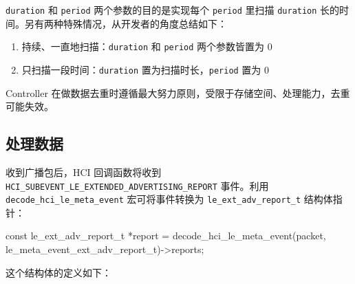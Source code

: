 \documentclass[
  12pt,
]{book}
\makeatletter
\newenvironment{Shaded}{\begin{snugshade}}{\end{snugshade}}
\newcommand{\DataTypeTok}[1]{\textcolor[rgb]{0.13,0.29,0.53}{#1}}
\newcommand{\NormalTok}[1]{#1}
\providecommand{\tightlist}{%
  \setlength{\itemsep}{0pt}\setlength{\parskip}{0pt}}
\newenvironment{kframe}{%
\medskip{}
\setlength{\fboxsep}{.8em}
 \def\at@end@of@kframe{}%
 \ifinner\ifhmode%
  \def\at@end@of@kframe{\end{minipage}}%
  \begin{minipage}{\columnwidth}%
 \fi\fi%
 \def\FrameCommand##1{\hskip\@totalleftmargin \hskip-\fboxsep
 \colorbox{shadecolor}{##1}\hskip-\fboxsep
     \hskip-\linewidth \hskip-\@totalleftmargin \hskip\columnwidth}%
 \MakeFramed {\advance\hsize-\width
   \@totalleftmargin\z@ \linewidth\hsize
   \@setminipage}}%
 {\par\unskip\endMakeFramed%
 \at@end@of@kframe}
\newenvironment{rmdblock}[1]
  {
  \begin{itemize}
  \renewcommand{\labelitemi}{
    \raisebox{-.7\height}[0pt][0pt]{
      {\setkeys{Gin}{width=3em,keepaspectratio}\texttt{[image: images/\#1]}}
    }
  }
  \setlength{\fboxsep}{1em}
  \begin{kframe}
  \item
  }
  {
  \end{kframe}
  \end{itemize}
  }
\newenvironment{rmdcaution}
  {\begin{rmdblock}{caution}}
  {\end{rmdblock}}
\makeatother
\begin{document}
\texttt{duration} 和 \texttt{period} 两个参数的目的是实现每个 \texttt{period} 里扫描 \texttt{duration} 长的时间。另有两种特殊情况，从开发者的角度总结如下：

\begin{enumerate}
\def\labelenumi{\arabic{enumi}.}
\tightlist
\item
  持续、一直地扫描：\texttt{duration} 和 \texttt{period} 两个参数皆置为 \(0\)
\item
  只扫描一段时间：\texttt{duration} 置为扫描时长，\texttt{period} 置为 \(0\)
\end{enumerate}

\begin{rmdcaution}
Controller
在做数据去重时遵循最大努力原则，受限于存储空间、处理能力，去重可能失效。
\end{rmdcaution}

\hypertarget{ux5904ux7406ux6570ux636e}{%
\subsection{处理数据}\label{ux5904ux7406ux6570ux636e}}

收到广播包后，HCI 回调函数将收到 \texttt{HCI\_SUBEVENT\_LE\_EXTENDED\_ADVERTISING\_REPORT} 事件。利用 \texttt{decode\_hci\_le\_meta\_event}
宏可将事件转换为 \texttt{le\_ext\_adv\_report\_t} 结构体指针：

\begin{Shaded}
\begin{Highlighting}[]
\DataTypeTok{const}\NormalTok{ le_ext_adv_report_t *report =}
\NormalTok{  decode_hci_le_meta_event(packet, le_meta_event_ext_adv_report_t)->reports;}
\end{Highlighting}
\end{Shaded}

这个结构体的定义如下：
\end{document}
